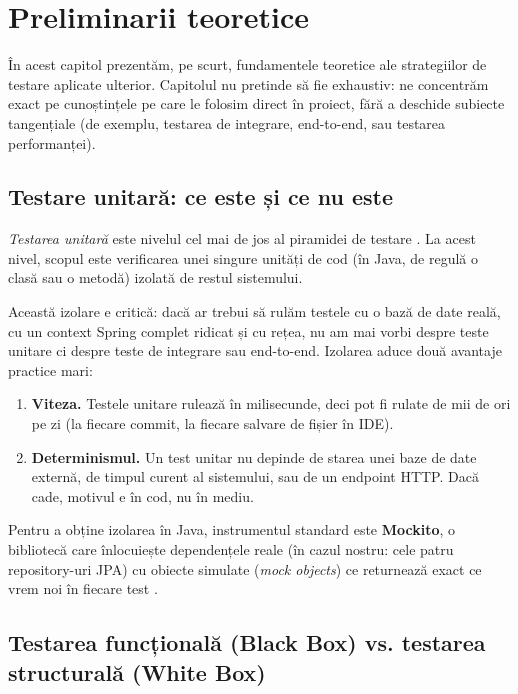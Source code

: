 \chapter{Preliminarii teoretice}
\label{ch:preliminarii}

În acest capitol prezentăm, pe scurt, fundamentele teoretice ale strategiilor de testare aplicate ulterior. Capitolul nu pretinde să fie exhaustiv: ne concentrăm exact pe cunoștințele pe care le folosim direct în proiect, fără a deschide subiecte tangențiale (de exemplu, testarea de integrare, end-to-end, sau testarea performanței).

\section{Testare unitară: ce este și ce nu este}

\textit{Testarea unitară} este nivelul cel mai de jos al piramidei de testare \cite{martin2008}. La acest nivel, scopul este verificarea unei singure unități de cod (în Java, de regulă o clasă sau o metodă) izolată de restul sistemului.

Această izolare e critică: dacă ar trebui să rulăm testele cu o bază de date reală, cu un context Spring complet ridicat și cu rețea, nu am mai vorbi despre teste unitare ci despre teste de integrare sau end-to-end. Izolarea aduce două avantaje practice mari:

\begin{enumerate}
    \item \textbf{Viteza.} Testele unitare rulează în milisecunde, deci pot fi rulate de mii de ori pe zi (la fiecare commit, la fiecare salvare de fișier în IDE).
    \item \textbf{Determinismul.} Un test unitar nu depinde de starea unei baze de date externă, de timpul curent al sistemului, sau de un endpoint HTTP. Dacă cade, motivul e în cod, nu în mediu.
\end{enumerate}

Pentru a obține izolarea în Java, instrumentul standard este \textbf{Mockito}, o bibliotecă care înlocuiește dependențele reale (în cazul nostru: cele patru repository-uri JPA) cu obiecte simulate (\textit{mock objects}) ce returnează exact ce vrem noi în fiecare test \cite{mockito_docs}.

\section{Testarea funcțională (Black Box) vs. testarea structurală (White Box)}


